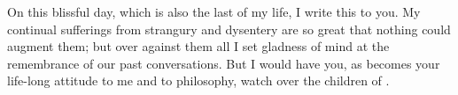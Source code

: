 \documentclass{stex}
\begin{document}


\noindent On this blissful day, which is also the last of my life, I write this to you.
My continual sufferings from strangury and dysentery are so great that nothing could augment them; but over against them all I set gladness of mind at the remembrance of our past conversations.
But I would have you, as becomes your life-long attitude to me and to philosophy, watch over the children of .
\end{document}
